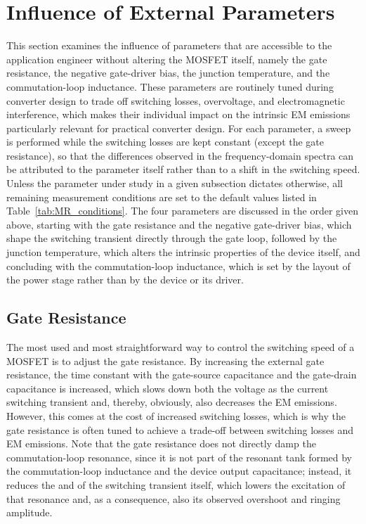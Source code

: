 \section{Influence of External Parameters}
\label{sec:MR_External}

This section examines the influence of parameters that are accessible to the application engineer without altering the MOSFET itself, namely the gate resistance, the negative gate-driver bias, the junction temperature, and the commutation-loop inductance.
These parameters are routinely tuned during converter design to trade off switching losses, overvoltage, and electromagnetic interference, which makes their individual impact on the intrinsic EM emissions particularly relevant for practical converter design.
For each parameter, a sweep is performed while the switching losses are kept constant (except the gate resistance), so that the differences observed in the frequency-domain spectra can be attributed to the parameter itself rather than to a shift in the switching speed.
Unless the parameter under study in a given subsection dictates otherwise, all remaining measurement conditions are set to the default values listed in Table~\ref{tab:MR_conditions}.
The four parameters are discussed in the order given above, starting with the gate resistance and the negative gate-driver bias, which shape the switching transient directly through the gate loop, followed by the junction temperature, which alters the intrinsic properties of the device itself, and concluding with the commutation-loop inductance, which is set by the layout of the power stage rather than by the device or its driver.

\subsection{Gate Resistance}

The most used and most straightforward way to control the switching speed of a MOSFET is to adjust the gate resistance.
By increasing the external gate resistance, the time constant with the gate-source capacitance and the gate-drain capacitance is increased, which slows down both the voltage as the current switching transient and, thereby, obviously, also decreases the EM emissions.
However, this comes at the cost of increased switching losses, which is why the gate resistance is often tuned to achieve a trade-off between switching losses and EM emissions.
Note that the gate resistance does not directly damp the commutation-loop resonance, since it is not part of the resonant tank formed by the commutation-loop inductance and the device output capacitance; instead, it reduces the  and  of the switching transient itself, which lowers the excitation of that resonance and, as a consequence, also its observed overshoot and ringing amplitude.


